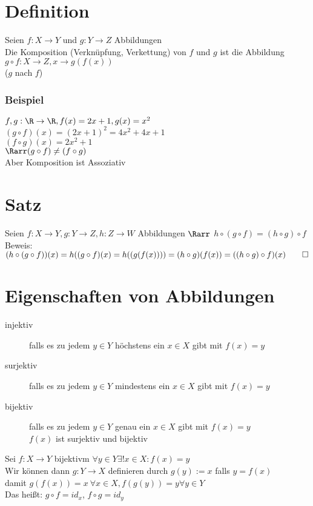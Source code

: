 \section{Definition}
Seien $f:X\to Y$ und $g: Y\to Z$ Abbildungen\\
Die Komposition (Verknüpfung, Verkettung) von $f$ und $g$ ist die Abbildung\\
$g\circ f: X\to Z, x \to g(f(x))$\\
($g$ nach $f$)\\
\subsubsection*{Beispiel}
$f, g: \R \to \R, f(x) = 2x+1 , g(x) = x^2$\\
$(g \circ f)(x) = (2x+1)^2 = 4x^2 + 4x + 1$\\
$(f \circ g)(x) = 2x^2 + 1$\\
$\Rarr (g \circ f) \neq (f \circ g)$\\
Aber Komposition ist Assoziativ
\section{Satz}
Seien $f:X\to Y, g:Y\to Z, h:Z\to W$ Abbildungen $\Rarr$ $h \circ (g \circ f) = (h \circ g) \circ f$\\
Beweis: $(h\circ (g\circ f))(x) = h((g\circ f)(x) = h((g(f(x)))) = (h \circ g)(f(x)) = ((h \circ g) \circ f)(x) \qed$
\section{Eigenschaften von Abbildungen}
\begin{description}
\item[injektiv] falls es zu jedem $y \in Y$ höchstens ein $x \in X$ gibt mit $f(x) = y$
\item[surjektiv] falls es zu jedem $y \in Y$ mindestens ein $x \in X$ gibt mit $f(x) = y$
\item[bijektiv] falls es zu jedem $y \in Y$ genau ein $x \in X$ gibt mit $f(x) = y$\\
$f(x)$ ist surjektiv und bijektiv
\end{description}
Sei $f:X\to Y$ bijektivm $\forall y\in Y \exists! x\in X: f(x) = y$\\
Wir können dann $g: Y\to X$ definieren durch $g(y) := x$ falls $y = f(x)$\\
damit $g(f(x)) = x\ \forall x\in X, f(g(y)) = y \forall y\in Y$\\
Das heißt: $g\circ f = id_x$, $f \circ g = id_y$
